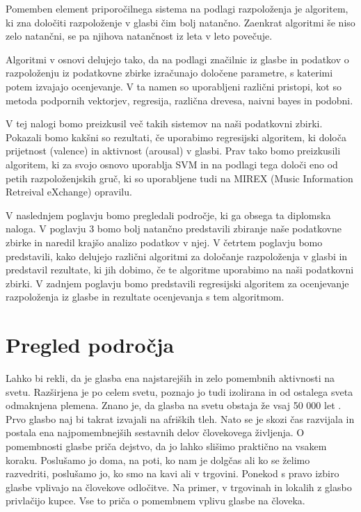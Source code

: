 \documentclass[a4paper, 12pt]{book}
\begin{document}
{Pomemben element priporočilnega sistema na podlagi razpoloženja je algoritem, ki zna določiti razpoloženje v glasbi čim bolj natančno. Zaenkrat algoritmi še niso zelo natančni, se pa njihova natančnost iz leta v leto povečuje.

Algoritmi v osnovi delujejo tako, da na podlagi značilnic iz glasbe in podatkov o razpoloženju iz podatkovne zbirke izračunajo določene parametre, s katerimi potem izvajajo ocenjevanje. V ta namen so uporabljeni različni pristopi, kot so metoda podpornih vektorjev, regresija, različna drevesa, naivni bayes in podobni. 

V tej nalogi bomo preizkusil več takih sistemov na naši podatkovni zbirki. Pokazali bomo kakšni so rezultati, če uporabimo regresijski algoritem, ki določa prijetnost (valence) in aktivnost (arousal) v glasbi. Prav tako bomo preizkusili algoritem, ki za svojo osnovo uporablja SVM in na podlagi tega določi eno od petih razpoloženjskih gruč, ki so uporabljene tudi na MIREX (Music Information Retreival eXchange) opravilu.

V naslednjem poglavju bomo pregledali področje, ki ga obsega ta diplomska naloga. V poglavju 3 bomo bolj natančno predstavili zbiranje naše podatkovne zbirke in naredil krajšo analizo podatkov v njej. V četrtem poglavju bomo predstavili, kako delujejo različni algoritmi za določanje razpoloženja v glasbi in predstavil rezultate, ki jih dobimo, če te algoritme uporabimo na naši podatkovni zbirki. V zadnjem poglavju bomo predstavili regresijski algoritem za ocenjevanje razpoloženja iz glasbe in rezultate ocenjevanja s tem algoritmom.

\chapter{Pregled področja}

Lahko bi rekli, da je glasba ena najstarejših in zelo pomembnih aktivnosti na svetu. Razširjena je po celem svetu, poznajo jo tudi izolirana in od ostalega sveta odmaknjena plemena. Znano je, da glasba na svetu obstaja že vsaj 50 000 let \cite{Krause2012}. Prvo glasbo naj bi takrat izvajali na afriških tleh. Nato se je skozi čas razvijala in postala ena najpomembnejših sestavnih delov človekovega življenja. O pomembnosti glasbe priča dejstvo, da jo lahko slišimo praktično na vsakem koraku. Poslušamo jo doma, na poti, ko nam je dolgčas ali ko se želimo razvedriti, poslušamo jo, ko smo na kavi ali v trgovini. Ponekod s pravo izbiro glasbe vplivajo na človekove odločitve. Na primer, v trgovinah in lokalih z glasbo privlačijo kupce. Vse to priča o pomembnem vplivu glasbe na človeka.  

}
\end{document}
